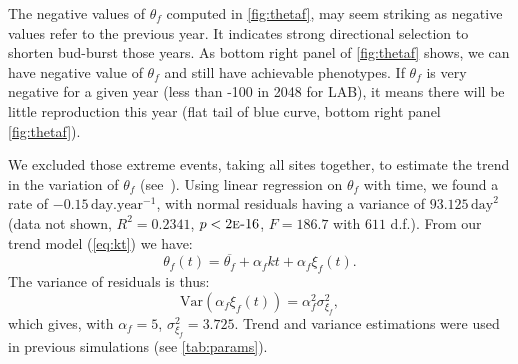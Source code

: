 The negative values of $\theta_f$ computed in \autoref{fig:thetaf}, may seem striking as negative values refer to the previous year. It indicates strong directional selection to shorten bud-burst those years. As bottom right panel of \autoref{fig:thetaf} shows, we can have negative value of $\theta_f$ and still have achievable phenotypes. If $\theta_f$ is very negative for a given year (less than -100 in 2048 for LAB), it means there will be little reproduction this year (flat tail of blue curve, bottom right panel \autoref{fig:thetaf}).

We excluded those extreme events, taking all sites together, to estimate the trend in the variation of $\theta_f$ (see~). Using linear regression on $\theta_f$ with time, we found a rate of $-0.15 \,\text{day}.\text{year}^{-1}$, with normal residuals having a variance of $93.125 \,\text{day}^2$ (data not shown, $R^2=0.2341$, $p<2\text{\sc{e}-}16$, $F=186.7$ with $611$ d.f.). From our trend model (\autoref{eq:kt}) we have:
\begin{equation}
\theta_f(t) = \overline{\theta_f} + \alpha_f k t + \alpha_f \xi_f(t).
\end{equation}
The variance of residuals is thus:
\begin{equation}
\text{Var}(\alpha_f \xi_f(t)) = \alpha_f^2 \sigma_{\xi_f}^2,
\end{equation}
which gives, with $\alpha_f = 5$, $\sigma_{\xi_f}^2 = 3.725$. Trend and variance estimations were used in previous simulations (see \autoref{tab:params}).